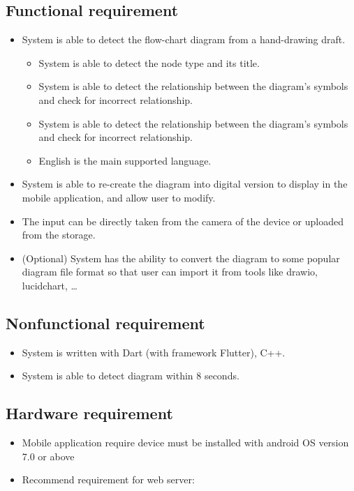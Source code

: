 \subsection{Functional requirement}
\begin{itemize}
    \item {System is able to detect the flow-chart diagram from a hand-drawing draft.}
    \begin{itemize}
        \item {System is able to detect the node type and its title.}
        \item {System is able to detect the relationship between the diagram’s symbols and check for incorrect relationship.}
        \item {System is able to detect the relationship between the diagram’s symbols and check for incorrect relationship.}
        \item {English is the main supported language.}
    \end{itemize}
    \item {System is able to re-create the diagram into digital version to display in the mobile application, and allow user to modify.}
    \item {The input can be directly taken from the camera of the device or uploaded from the storage.}
    \item {(Optional) System has the ability to convert the diagram to some popular diagram file format so that user can import it from tools like drawio, lucidchart, …}
\end{itemize}

\subsection{Nonfunctional requirement}
\begin{itemize}
    \item {System is written with Dart (with framework Flutter), C++.}
    \item {System is able to detect diagram within 8 seconds.}
\end{itemize}

\subsection{Hardware requirement}
\begin{itemize}
    \item {Mobile application require device must be installed with android OS version 7.0 or above }
    \item {Recommend requirement for web server:}
\end{itemize}
